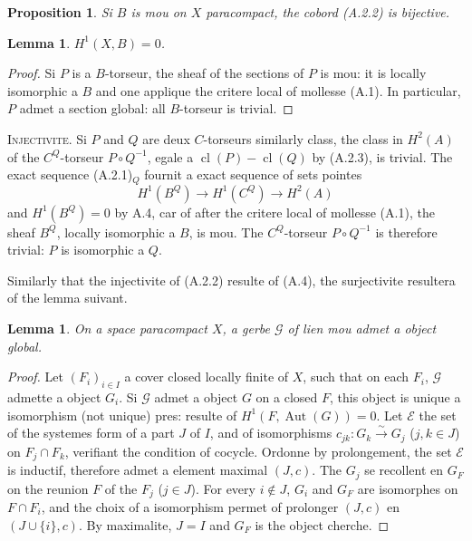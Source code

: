 \documentclass[11pt,a4paper]{article}
\theoremstyle{plain}
\newtheorem{lemma}[theorem]{Lemma}
\newtheorem{proposition}[theorem]{Proposition}
\theoremstyle{definition}
\DeclareMathOperator{\Aut}{Aut}
\DeclareMathOperator{\cl}{cl}
\newcommand{\iso}{\xrightarrow{\sim}}
\begin{document}
\begin{proposition}
Si $B$ is mou on $X$ paracompact, the cobord (A.2.2) is bijective.
\end{proposition}

\begin{lemma}
$H^{1}(X, B) = 0$.
\end{lemma}

\begin{proof}
Si $P$ is a $B$-torseur, the sheaf of the sections of $P$ is mou: it is locally
isomorphic a $B$ and one applique the critere local of mollesse (A.1). In particular, $P$
admet a section global: all $B$-torseur is trivial.
\end{proof}

\noindent \textsc{Injectivite.} Si $P$ and $Q$ are deux $C$-torseurs similarly class, the class in $H^{2}(A)$
of the $C^{Q}$-torseur $P \circ Q^{-1}$, egale a $\cl(P) - \cl(Q)$ by (A.2.3), is trivial. The exact sequence (A.2.1)$_{Q}$ fournit a exact sequence of sets pointes
\[
H^{1}(B^{Q}) \longrightarrow H^{1}(C^{Q}) \longrightarrow H^{2}(A)
\]
and $H^{1}(B^{Q}) = 0$ by A.4, car of after the critere local of mollesse (A.1), the sheaf $B^{Q}$, locally isomorphic a $B$, is mou. The $C^{Q}$-torseur $P \circ Q^{-1}$ is therefore trivial: $P$
is isomorphic a $Q$.

Similarly that the injectivite of (A.2.2) resulte of (A.4), the surjectivite resultera
of the lemma suivant.

\begin{lemma}
On a space paracompact $X$, a gerbe $\mathcal{G}$ of lien mou admet a object global.
\end{lemma}

\begin{proof}
Let $(F_{i})_{i \in I}$ a cover closed locally finite of $X$, such that on each
$F_{i}$, $\mathcal{G}$ admette a object $G_{i}$. Si $\mathcal{G}$ admet a object $G$ on a closed $F$, this object
is unique a isomorphism (not unique) pres: resulte of $H^{1}(F, \Aut(G)) = 0$.
Let $\mathcal{E}$ the set of the systemes form of a part $J$ of $I$, and of isomorphisms
$c_{jk}: G_{k} \iso G_{j}$ ($j,k \in J$) on $F_{j} \cap F_{k}$, verifiant the condition of cocycle. Ordonne by
prolongement, the set $\mathcal{E}$ is inductif, therefore admet a element maximal $(J, c)$.
The $G_{j}$ se recollent en $G_{F}$ on the reunion $F$ of the $F_{j}$ ($j \in J$). For every $i \notin J$, $G_{i}$ and $G_{F}$ are isomorphes on $F \cap F_{i}$, and the choix of a isomorphism permet of prolonger $(J, c)$ en $(J \cup \{i\}, c)$. By maximalite, $J = I$ and $G_{F}$ is the object cherche.
\end{proof}
\end{document}
